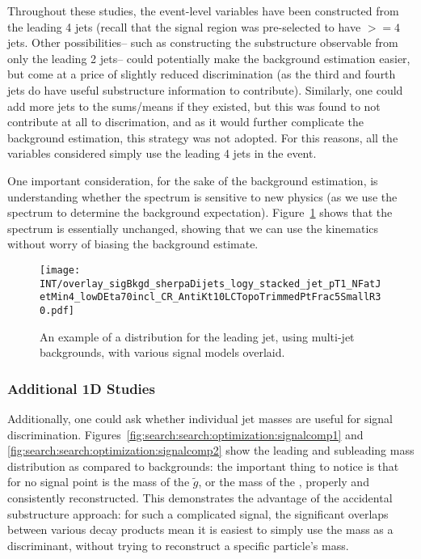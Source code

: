 Throughout these studies, the event-level variables have been constructed from the leading 4 jets (recall that the signal region was pre-selected to have $>=4$ jets. Other possibilities-- such as constructing the substructure observable from only the leading 2 jets-- could potentially make the background estimation easier, but come at a price of slightly reduced discrimination (as the third and fourth jets do have useful substructure information to contribute). Similarly, one could add more jets to the sums/means if they existed, but this was found to not contribute at all to discrimation, and as it would further complicate the background estimation, this strategy was not adopted. For this reasons, all the variables considered simply use the leading 4 jets in the event.

One important consideration, for the sake of the background estimation, is understanding whether the \pt spectrum is sensitive to new physics (as we use the \pt spectrum to determine the background expectation). Figure~\ref{fig:search:search:optimization:pt} shows that the \pt spectrum is essentially unchanged, showing that we can use the kinematics without worry of biasing the background estimate.


\begin{figure}
\centering
\texttt{[image: INT/overlay\_sigBkgd\_sherpaDijets\_logy\_stacked\_jet\_pT1\_NFatJetMin4\_lowDEta70incl\_CR\_AntiKt10LCTopoTrimmedPtFrac5SmallR30.pdf]}
\label{fig:search:search:optimization:pt}
\caption{An example of a \pt distribution for the leading jet, using \Sherpa multi-jet backgrounds, with various signal models overlaid.}
\end{figure}


\subsubsection{Additional 1D Studies}

Additionally, one could ask whether individual jet masses are useful for signal discrimination. Figures~\ref{fig:search:search:optimization:signalcomp1} and \ref{fig:search:search:optimization:signalcomp2} show the leading and subleading mass distribution as compared to \Herwigpp backgrounds: the important thing to notice is that for no signal point is the mass of the $\tilde{g}$, or the mass of the \lsp, properly and consistently reconstructed. This demonstrates the advantage of the accidental substructure approach: for such a complicated signal, the significant overlaps between various decay products mean it is easiest to simply use the mass as a discriminant, without trying to reconstruct a specific particle's mass.


